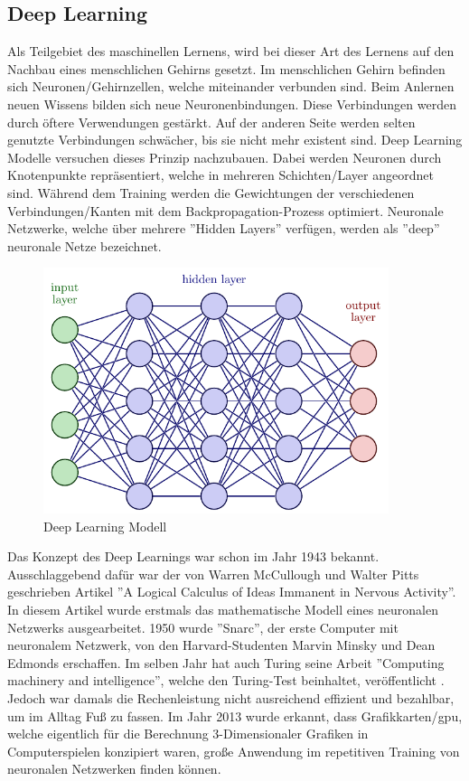 \documentclass[12pt,a4paper]{article}
\begin{document}
	\subsection{Deep Learning}
		Als Teilgebiet des maschinellen Lernens, wird bei dieser Art des Lernens auf den Nachbau eines menschlichen Gehirns gesetzt.
		Im menschlichen Gehirn befinden sich Neuronen/Gehirnzellen, welche miteinander verbunden sind. 
		Beim Anlernen neuen Wissens bilden sich neue Neuronenbindungen.
		Diese Verbindungen werden durch öftere Verwendungen gestärkt.
		Auf der anderen Seite werden selten genutzte Verbindungen schwächer, bis sie nicht mehr existent sind.
		Deep Learning Modelle versuchen dieses Prinzip nachzubauen.
		Dabei werden Neuronen durch Knotenpunkte repräsentiert, welche in mehreren Schichten/Layer angeordnet sind.
		Während dem Training werden die Gewichtungen der verschiedenen Verbindungen/Kanten mit dem Backpropagation-Prozess optimiert.
		Neuronale Netzwerke, welche über mehrere ''Hidden Layers'' verfügen, werden als ''deep'' neuronale Netze bezeichnet.
		\cite[\ac{vgl}][S.424]{10.1111/bjd.18880}
		\begin{figure}[H]
			\begin{center}
				\includegraphics[width=0.9\textwidth, page=1]{Dateien/NeuralNetwork.pdf}
				\caption{Deep Learning Modell \cite[][]{site:neuralnetwork}}
				\label{img:deeplearning}
			\end{center}
		\end{figure}
		Das Konzept des Deep Learnings war schon im Jahr 1943 bekannt.
		Ausschlaggebend dafür war der von Warren McCullough und Walter Pitts geschrieben Artikel ''A Logical Calculus of Ideas Immanent in Nervous Activity''.
		In diesem Artikel wurde erstmals das mathematische Modell eines neuronalen Netzwerks ausgearbeitet.
		1950 wurde ''Snarc'', der erste Computer mit neuronalem Netzwerk, von den Harvard-Studenten Marvin Minsky und Dean Edmonds erschaffen.
		Im selben Jahr hat auch Turing seine Arbeit ''Computing machinery and intelligence'', welche den Turing-Test beinhaltet, veröffentlicht \cite[\ac{vgl}][]{site:datascientestki}.
		Jedoch war damals die Rechenleistung nicht ausreichend effizient und bezahlbar, um im Alltag Fuß zu fassen.
		Im Jahr 2013 wurde erkannt, dass Grafikkarten/\ac{gpu}, welche eigentlich für die Berechnung 3-Dimensionaler Grafiken in Computerspielen konzipiert waren, große Anwendung im repetitiven Training von neuronalen Netzwerken finden können.
\end{document}

